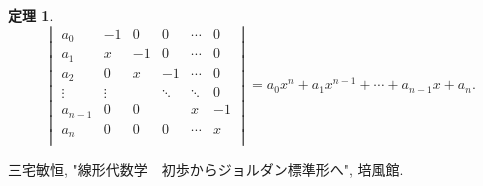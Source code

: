 \documentclass[dvipdfmx,a4paper,11pt]{article}
\theoremstyle{definition}
\newtheorem{thm}{定理}
\begin{document}
\begin{tcolorbox}[
    colback = white,
    colframe = green!35!black,
    fonttitle = \bfseries,
    breakable = true]
    \begin{thm}
$$
 \begin{vmatrix}
a_0   &   -1   &0 &0 & \cdots &  0 \\
a_1   &   x    &-1  &0 & \cdots &  0 \\
a_2   &   0    & x   &-1 & \cdots &  0 \\
\vdots  &    \vdots   &   &\ddots & \ddots &  0 \\
a_{n-1}&   0    & 0   &                  & x&  -1\\
a_n   &   0   & 0   &0 & \cdots &  x\\
\end{vmatrix}
=a_0 x^{n} +  a_1 x^{n-1} +  \cdots +  a_{n-1} x + a_{n}.
$$
    \end{thm}
 \end{tcolorbox}
  
\begin{thebibliography}{n}
三宅敏恒, "線形代数学　初歩からジョルダン標準形へ", 培風館.
\end{thebibliography}
 
\end{document}

